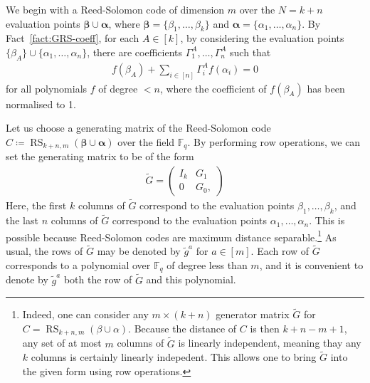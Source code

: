 \documentclass[11pt]{article}
\theoremstyle{definition}
\newcommand{\bigN}{N}
\DeclareMathOperator{\RS}{RS}
\begin{document}
We begin with a Reed-Solomon code of dimension $m$ over the $\bigN = k + n$ evaluation points $\mathbf{\beta} \cup \mathbf{\alpha}$, where $\mathbf{\beta} = \{ \beta_1, \dots, \beta_k \}$ and
$\mathbf{\alpha} = \{ \alpha_1, \dots, \alpha_n \}$. By Fact~\ref{fact:GRS-coeff}, 
for each $A \in [k]$, by considering the evaluation points $\{ \beta_A \} \cup \{ \alpha_1, \dots, \alpha_n \}$, there are coefficients $\Gamma^A_1, \dots, \Gamma^A_n$ such that 
\begin{align}
    f(\beta_A) + \sum_{i \in [n]} \Gamma^A_i f(\alpha_i) = 0 \label{eqn:A-addressable}
\end{align}
for all polynomials $f$ of degree $< n$, where the coefficient of $f(\beta_A)$ has been normalised to 1.

Let us choose a generating matrix of the Reed-Solomon code $C \coloneq \RS_{k+n, m}(\mathbf{\beta} \cup \mathbf{\alpha})$ over the field $\mathbb{F}_q$. By performing row operations, we can set the generating matrix to be of the form 
\begin{align}\label{eq:partially_systematic_gen_mat}
    \tilde{G} = \begin{pmatrix}
        I_k & G_1 \\
        0 & G_0,
    \end{pmatrix}
\end{align}
Here, the first $k$ columns of $\tilde{G}$ correspond to the evaluation points $\beta_1, \dots, \beta_k$, and the last $n$ columns of $\tilde{G}$ correspond to the evaluation points $\alpha_1, \dots, \alpha_n$. 
This is possible because Reed-Solomon codes are maximum distance separable.\footnote{Indeed, one can consider any $m \times (k+n)$ generator matrix $\tilde{G}$ for $C = \RS_{k+n,m}(\beta\cup\alpha)$. Because the distance of $C$ is then $k+n-m+1$, any set of at most $m$ columns of $\tilde{G}$ is linearly independent, meaning thay any $k$ columns is certainly linearly indepedent. This allows one to bring $\tilde{G}$ into the given form using row operations.} As usual, the rows of $\tilde{G}$ may be denoted by $\tilde{g}^a$ for $a \in [m]$. Each row of $\tilde{G}$ corresponds to a polynomial over $\mathbb{F}_q$ of degree less than $m$, and it is convenient to denote by $\tilde{g}^a$ both the row of $\tilde{G}$ and this polynomial.
\end{document}
